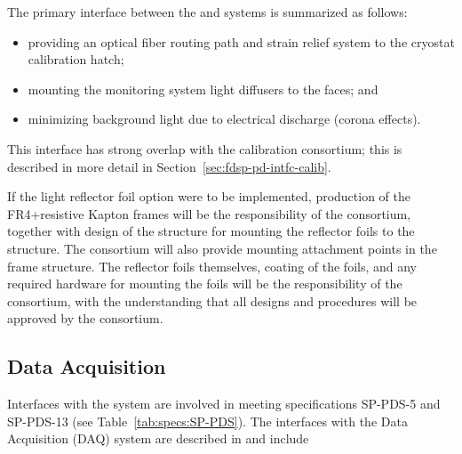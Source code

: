 The primary interface between the  and  systems is summarized as follows:
\begin{itemize}
    \item providing an optical fiber routing path and strain relief system to the cryostat calibration hatch;
    \item mounting the  monitoring system light diffusers to the  faces; and     
    \item minimizing background light due to electrical discharge (corona effects).
\end{itemize} 


This interface has strong overlap with the calibration consortium; this is described in more detail in Section~\ref{sec:fdsp-pd-intfc-calib}.

If the light reflector foil option were to be implemented, production of the FR4+resistive Kapton  frames will be the responsibility of the  consortium, together with design of the structure for mounting the  reflector foils to the  structure.  The  consortium will also provide mounting attachment points in the  frame structure.
 The reflector foils themselves,  coating of the  foils, and any required hardware for mounting the foils will be the responsibility of the  consortium, with the understanding that all designs and procedures will be approved by the  consortium. 


\subsection{Data Acquisition}
\label{sec:fdsp-pd-intfc-daq}



Interfaces with the  system are involved in meeting specifications SP-PDS-5
and SP-PDS-13 (see Table~\ref{tab:specs:SP-PDS}).  The  interfaces with the Data Acquisition (DAQ) system are described in  and include

